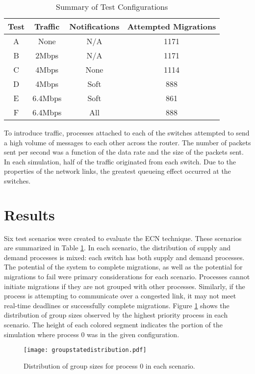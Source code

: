 \begin{table}
\centering
\caption{Summary of Test Configurations}
\begin{tabular}{| c | c | c | c |}
    \hline
    Test & Traffic & Notifications & Attempted Migrations \\ \hline
    A & None & N/A & 1171 \\ \hline
    B & 2Mbps & N/A & 1171 \\ \hline
    C & 4Mbps & None & 1114  \\ \hline
    D & 4Mbps & Soft & 888 \\ \hline
    E & 6.4Mbps & Soft & 861 \\ \hline
    F & 6.4Mbps & All & 888 \\ \hline
\end{tabular}
\label{tab:scenarios}
\end{table}

To introduce traffic, processes attached to each of the switches attempted to send a high volume of messages to each other across the router.
The number of packets sent per second was a function of the data rate and the size of the packets sent.
In each simulation, half of the traffic originated from each switch.
Due to the properties of the network links, the greatest queueing effect occurred at the switches.

\section{Results}
\label{sect:results}
Six test scenarios were created to evaluate the \ac{ECN} technique.
These scenarios are summarized in Table \ref{tab:scenarios}.
In each scenario, the distribution of supply and demand processes is mixed: each switch has both supply and demand processes.
The potential of the system to complete migrations, as well as the potential for migrations to fail were primary considerations for each scenario.
Processes cannot initiate migrations if they are not grouped with other processes.
Similarly, if the process is attempting to communicate over a congested link, it may not meet real-time deadlines or successfully complete migrations.
Figure \ref{fig:groupstatedistro} shows the distribution of group sizes observed by the highest priority process in each scenario.
The height of each colored segment indicates the portion of the simulation where process 0 was in the given configuration.

\begin{figure}
\centering
\texttt{[image: groupstatedistribution.pdf]}
\caption{Distribution of group sizes for process 0 in each scenario.}
\label{fig:groupstatedistro}
\end{figure}


